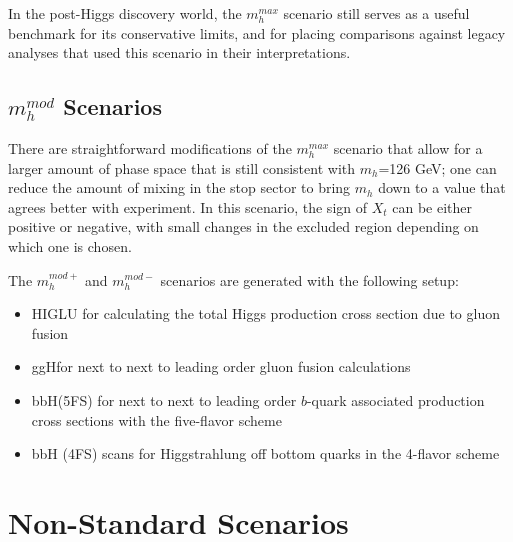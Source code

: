 In the post-Higgs discovery world, the $m_h^{max}$ scenario still serves as a useful
benchmark for its conservative limits, and for placing comparisons against legacy analyses
that used this scenario in their interpretations.   




\subsection{$m_h^{mod}$ Scenarios}
There are straightforward modifications of the $m_h^{max}$ scenario that allow for 
a larger amount of phase space that is still consistent with $m_h$=126 GeV; one
can reduce the amount of mixing in the stop sector to bring $m_h$ down to a value
that agrees better with experiment.  In this scenario, the sign of $X_t$ can be either
positive or negative, with small changes in the excluded region depending on 
which one is chosen.

The $m_h^{mod+}$ and $m_h^{mod-}$ scenarios are generated with the following setup:
\begin{itemize}
    \item HIGLU for calculating the total Higgs production cross section due to gluon fusion \cite{higlu}
    \item ggH\@NNLO for next to next to leading order gluon fusion calculations \cite{gghnnlo} 
    \item bbH\@NNLO (5FS) for next to next to leading order $b$-quark associated production cross sections with the five-flavor scheme \cite{bbhnnlo}
    \item bbH (4FS) scans for Higgstrahlung off bottom quarks in the 4-flavor scheme \cite{bbh_4fs_1} \cite{bbh_4fs_2}
\end{itemize}





\section{Non-Standard Scenarios}
\label{sec:interp_new_benchmark} 




